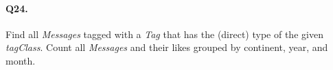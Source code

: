 \paragraph{Q24.}
Find all \emph{Messages} tagged with a \emph{Tag} that has the (direct)
type of the given \emph{tagClass}.
Count all \emph{Messages} and their likes grouped by continent, year,
and month.
